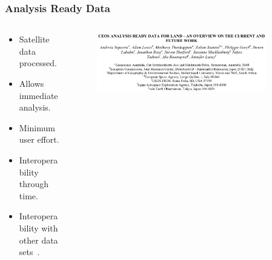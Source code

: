 \documentclass[aspectratio=169]{beamer}
\begin{document}
\begin{frame}
    \frametitle{Analysis Ready Data}
    \begin{columns}
        \begin{column}{0.5\textwidth}
            \begin{itemize}
                \item Satellite data processed. 
                \item Allows immediate analysis. 
                \item Minimum user effort. 
                \item Interoperability through time. 
                \item Interoperability with other data 
                    sets~\cite{siqueira2019}.
            \end{itemize}
        \end{column}
        \begin{column}{0.5\textwidth}
            \begin{figure}
                \centering
                \includegraphics[width=0.9\textwidth]{img/siqueira2019.png}
            \end{figure}
        \end{column}
    \end{columns}
\end{frame}
\end{document}
